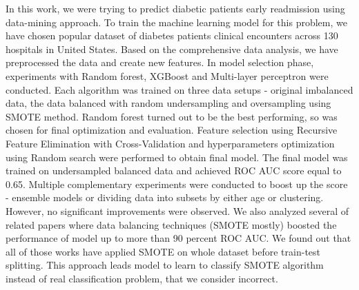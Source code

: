 \documentclass[runningheads]{llncs}
\begin{document}
In this work, we were trying to predict diabetic patients early readmission using data-mining approach. To train the machine learning model for this problem, we have chosen popular dataset of diabetes patients clinical encounters across 130 hospitals in United States. Based on the comprehensive data analysis, we have preprocessed the data and create new features. In model selection phase, experiments with Random forest, XGBoost and Multi-layer perceptron were conducted. Each algorithm was trained on three data setups - original imbalanced data, the data balanced with random undersampling and oversampling using SMOTE method. Random forest turned out to be the best performing, so was chosen for final optimization and evaluation. Feature selection using Recursive Feature Elimination with Cross-Validation and hyperparameters optimization using Random search were performed to obtain final model. The final model was trained on undersampled balanced data and achieved ROC AUC score equal to 0.65. Multiple complementary experiments were conducted to boost up the score - ensemble models or dividing data into subsets by either age or clustering. However, no significant improvements were observed. We also analyzed several of related papers where data balancing techniques (SMOTE mostly) boosted the performance of model up to more than 90 percent ROC AUC. We found out that all of those works have applied SMOTE on whole dataset before train-test splitting. This approach leads model to learn to classify SMOTE algorithm instead of real classification problem, that we consider incorrect.


%


\end{document}
